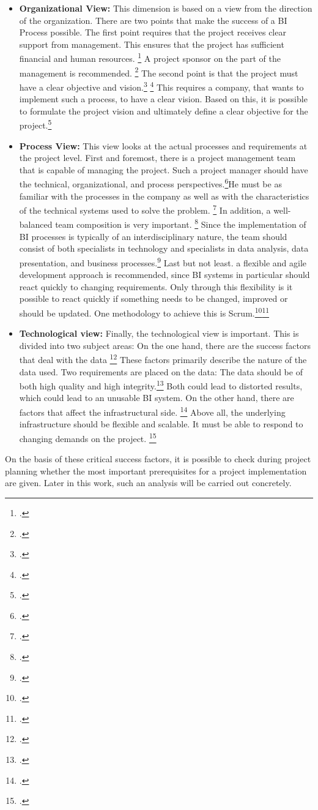 \begin{itemize}
    \item \textbf{Organizational View: }This dimension is based on a view from the direction of the organization.
    There are two points that make the success of a \ac{BI} Process possible. The first point requires that the project
    receives clear support from management. This ensures that the project has sufficient financial and human resources.
    \footcite[Cf.][p. 98]{watson2007current} A project sponsor on the part of the management is recommended.
    \footcite[Cf.][pp. 87]{yeoh2008managing} The second point is that the project must have a clear objective and vision.\footcite[Cf.][pp. 87]{yeoh2008managing}
    \footcite[Cf.][p. 50]{villamarin2017key} This requires a company, that wants to implement such a process, to have a clear vision.
    Based on this, it is possible to formulate the project vision and ultimately define a clear
    objective for the project.\footcite[Cf.][pp. 87]{yeoh2008managing}
    \item \textbf{Process View: }This view looks at the actual processes and requirements at the project level.
    First and foremost, there is a project management team that is capable of managing the project. Such a project manager should have the
    technical, organizational, and process perspectives.\footcite[Cf.][p. 27]{yeoh2010critical}He must be as familiar with the
    processes in the company as well as with the characteristics of the technical systems used to solve the problem.
    \footcite[Cf.][pp. 88]{yeoh2008managing} In addition, a well-balanced team composition is very important.
    \footcite[Cf.][pp. 87]{yeoh2008managing} Since the implementation of BI processes is typically of an
    interdisciplinary nature, the team should consist of both specialists in technology and specialists in
    data analysis, data presentation, and business processes.\footcite[Cf.][Fig. 7]{muntean2013agile} Last but not least.
    a flexible and agile development approach is recommended, since \ac{BI} systems in particular should react quickly to changing requirements.
    Only through this flexibility is it possible to react quickly if something needs to be changed, improved
    or should be updated. One methodology to achieve this is
    Scrum.\footcite[Cf.][p. 164]{isik2011business}\footcite[Cf.][p. 3817]{knabke2013understanding}
    \item \textbf{Technological view: }Finally, the technological view is important. This is divided into two
    subject areas: On the one hand, there are the success factors that deal with the data
    \footcite[Cf.][Fig. 1]{yeoh2010critical} These factors primarily describe the nature of the data used.
    Two requirements are placed on the data: The data should be of both high quality and high
    integrity.\footcite[Cf.][p. 163]{isik2011business} Both could lead to distorted results,
    which could lead to an unusable BI system. On the other hand, there are factors that affect the infrastructural side.
    \footcite[Cf.][Fig. 1]{yeoh2010critical} Above all, the underlying infrastructure should be flexible and
    scalable. It must be able to respond to changing demands on the project.
    \footcite[Cf.][pp. 89]{yeoh2008managing}
\end{itemize}

On the basis of these critical success factors, it is possible to check during project planning whether the most important
prerequisites for a project implementation are given. Later in this work, such an analysis will be carried out concretely.